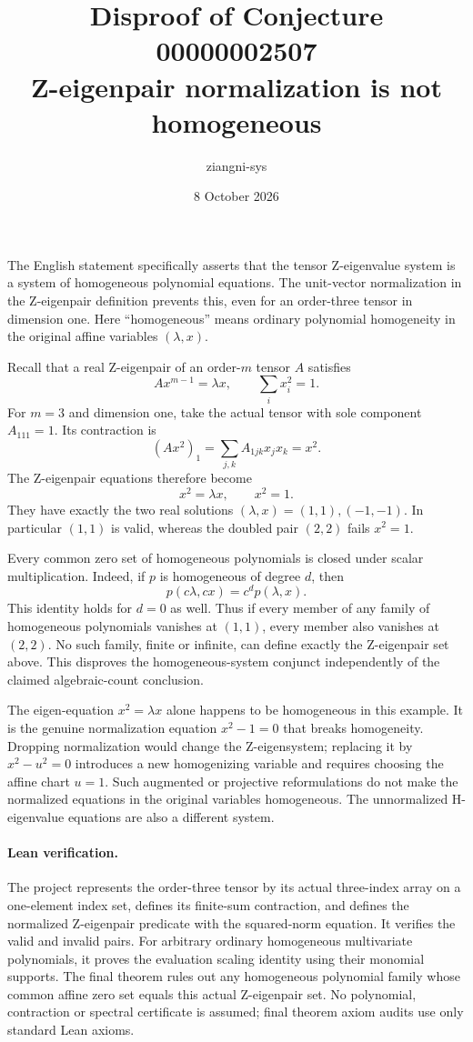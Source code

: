 \documentclass[11pt]{article}
\title{Disproof of Conjecture 00000002507\\Z-eigenpair normalization is not homogeneous}
\author{ziangni-sys}
\date{8 October 2026}
\begin{document}
\maketitle
The English statement specifically asserts that the tensor Z-eigenvalue system is a system of homogeneous polynomial equations. The unit-vector normalization in the Z-eigenpair definition prevents this, even for an order-three tensor in dimension one. Here ``homogeneous'' means ordinary polynomial homogeneity in the original affine variables $(\lambda,x)$.

Recall that a real Z-eigenpair of an order-$m$ tensor $A$ satisfies
\[
 A x^{m-1}=\lambda x,\qquad \sum_i x_i^2=1.
\]
For $m=3$ and dimension one, take the actual tensor with sole component $A_{111}=1$. Its contraction is
\[
 (Ax^2)_1=\sum_{j,k}A_{1jk}x_jx_k=x^2.
\]
The Z-eigenpair equations therefore become
\[
 x^2=\lambda x,\qquad x^2=1.
\]
They have exactly the two real solutions $(\lambda,x)=(1,1),(-1,-1)$. In particular $(1,1)$ is valid, whereas the doubled pair $(2,2)$ fails $x^2=1$.

Every common zero set of homogeneous polynomials is closed under scalar multiplication. Indeed, if $p$ is homogeneous of degree $d$, then
\[
 p(c\lambda,cx)=c^d p(\lambda,x).
\]
This identity holds for $d=0$ as well. Thus if every member of any family of homogeneous polynomials vanishes at $(1,1)$, every member also vanishes at $(2,2)$. No such family, finite or infinite, can define exactly the Z-eigenpair set above. This disproves the homogeneous-system conjunct independently of the claimed algebraic-count conclusion.

The eigen-equation $x^2=\lambda x$ alone happens to be homogeneous in this example. It is the genuine normalization equation $x^2-1=0$ that breaks homogeneity. Dropping normalization would change the Z-eigensystem; replacing it by $x^2-u^2=0$ introduces a new homogenizing variable and requires choosing the affine chart $u=1$. Such augmented or projective reformulations do not make the normalized equations in the original variables homogeneous. The unnormalized H-eigenvalue equations are also a different system.

\paragraph{Lean verification.}\sloppy
The project represents the order-three tensor by its actual three-index array on a one-element index set, defines its finite-sum contraction, and defines the normalized Z-eigenpair predicate with the squared-norm equation. It verifies the valid and invalid pairs. For arbitrary ordinary homogeneous multivariate polynomials, it proves the evaluation scaling identity using their monomial supports. The final theorem rules out any homogeneous polynomial family whose common affine zero set equals this actual Z-eigenpair set. No polynomial, contraction or spectral certificate is assumed; final theorem axiom audits use only standard Lean axioms.
\end{document}
